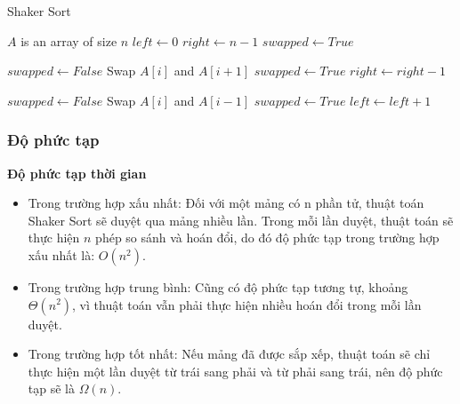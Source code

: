\begin{algorithm}[H]
\caption{Shaker Sort}
\label{alg:shaker-sort}
\begin{algorithmic}

\Require $A$ is an array of size $n$
\State $left \gets 0$ 
\State $right \gets n-1$ 
\State $swapped \gets True$ 

 \State {}
    \State $swapped \gets False$ 
     
         
            \State Swap $A[i]$ and $A[i+1]$ 
            \State $swapped \gets True$ 
        \EndIf
    \EndFor
    \State $right \gets right - 1$ 

     
        \State $swapped \gets False$ 
         
             
                \State Swap $A[i]$ and $A[i-1]$ 
                \State $swapped \gets True$ 
            \EndIf
        \EndFor
        \State $left \gets left + 1$ 
    \EndIf

\EndWhile
\EndFunction

\end{algorithmic}
\end{algorithm}


\subsubsection{Độ phức tạp}

\textbf{Độ phức tạp thời gian}\cite{shaker_sort_cite}

\begin{itemize}
    \item Trong trường hợp xấu nhất: Đối với một mảng có n phần tử, thuật toán Shaker Sort sẽ duyệt qua mảng nhiều lần. Trong mỗi lần duyệt, thuật toán sẽ thực hiện $n$ phép so sánh và hoán đổi, do đó độ phức tạp trong trường hợp xấu nhất là: $O(n^2)$.
    \item Trong trường hợp trung bình: Cũng có độ phức tạp tương tự, khoảng $\Theta(n^2)$, vì thuật toán vẫn phải thực hiện nhiều hoán đổi trong mỗi lần duyệt.
    \item Trong trường hợp tốt nhất: Nếu mảng đã được sắp xếp, thuật toán sẽ chỉ thực hiện một lần duyệt từ trái sang phải và từ phải sang trái, nên độ phức tạp sẽ là $\Omega(n)$.
\end{itemize}

